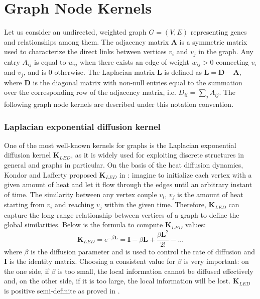 \section{Graph Node Kernels}
Let us consider an undirected, weighted graph $G = (V, E)$ representing genes and relationships among them. The adjacency matrix $\textbf{A}$ is a symmetric matrix used to characterize the direct links between vertices $v_{i}$ and $v_{j}$ in the graph. Any entry $A_{ij}$ is equal to $w_{ij}$ when there exists an edge of weight $w_{ij}>0$ connecting $v_{i}$ and $v_{j}$, and is 0 otherwise. The Laplacian matrix $\textbf{L}$ is defined as $\textbf{L} = \textbf{D}-\textbf{A}$, where $\textbf{D}$ is the diagonal matrix with non-null entries equal to the summation over the corresponding row of the adjacency matrix, i.e. $D_{ii}=\sum_j A_{ij}$. The following graph node kernels are described under this notation convention.
\subsubsection*{Laplacian exponential diffusion kernel}
One of the most well-known kernels for graphs is the Laplacian exponential diffusion kernel $\textbf{K}_{LED}$, as it is widely used for exploiting discrete structures in general and graphs in particular. On the basis of the heat diffusion dynamics, Kondor and Lafferty proposed $\textbf{K}_{LED}$ in \cite{ledk}: imagine to initialize each vertex with a given amount of heat and let it flow through the edges until an arbitrary instant of time. The similarity between any vertex couple $v_{i}$, $v_{j}$ is the amount of heat starting from $v_{i}$ and reaching $v_{j}$ within the given time. Therefore, $\textbf{K}_{LED}$ can capture the long range relationship between vertices of a graph to define the global similarities. Below is the formula to compute $\textbf{K}_{LED}$ values:
\begin{equation} \label{LEDK-formula}
\textbf{K}_{LED} = e^{-\beta \textbf{L}} = \textbf{I} - \beta \textbf{L} + \frac{\beta \textbf{L}^{2}}{2!} - ...
\end{equation}
where $\beta$ is the diffusion parameter and is used to control the rate of diffusion and $\textbf{I}$ is the identity matrix. Choosing a consistent value for $\beta$ is very important: on the one side, if $\beta$ is too small, the local information cannot be diffused effectively and, on the other side, if it is too large, the local information will be lost. $\textbf{K}_{LED}$ is positive semi-definite as proved in \cite{ledk}.
